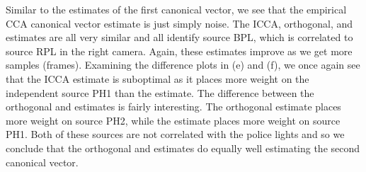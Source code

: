 Similar to the estimates of the first canonical vector, we see that the empirical CCA
canonical vector estimate is just simply noise. The ICCA, orthogonal, and \iccap
estimates are all very similar and all identify source BPL, which is correlated to source
RPL in the right camera. Again, these estimates improve as we get more samples
(frames). Examining the difference plots in (e) and (f), we once again see that the ICCA
estimate is suboptimal as it places more weight on the independent source PH1 than the
\iccap estimate. The difference between the orthogonal and \iccap estimates is fairly
interesting. The orthogonal estimate places more weight on source PH2, while the \iccap
estimate places more weight on source PH1. Both of these sources are not correlated with
the police lights and so we conclude that the orthogonal and \iccap estimates do equally
well estimating the second canonical vector.

